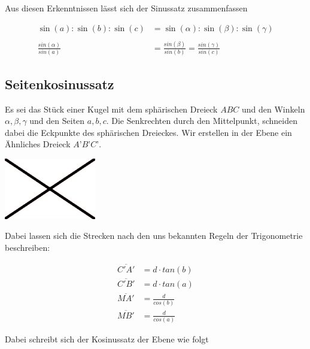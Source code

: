 \begin{refsection}
Aus diesen Erkenntnissen lässt sich der Sinussatz zusammenfassen

\begin{satz}
\label{skript:kugel:satz:Sinussatz}
\end{satz}

\begin{align*}
\sin(a) : \sin(b) : \sin(c) &= \sin(\alpha) : \sin(\beta) : \sin(\gamma) \\
 \\
\frac{sin(\alpha)}{sin(a)} &= \frac{sin(\beta)}{sin(b)} = \frac{sin(\gamma)}{sin(c)}
\end{align*} 


\subsection{Seitenkosinussatz}

Es sei das Stück einer Kugel mit dem sphärischen Dreieck $ABC$ und den Winkeln $\alpha, \beta, \gamma$ und den Seiten $a, b, c$. Die Senkrechten durch den Mittelpunkt, schneiden dabei die Eckpunkte des sphärischen Dreieckes. Wir erstellen in der Ebene ein Ähnliches Dreieck $A’B’C’$.

\begin{center}
        \includegraphics[width=0.3\textwidth]{kugel/Beispielbild.jpg}
\end{center}

Dabei lassen sich die Strecken nach den uns bekannten Regeln der Trigonometrie beschreiben:

\begin{align*}
\overline{C'A'} &= d\cdot {tan(b)} \\
\overline{C'B'} &= d\cdot {tan(a)} \\
\overline{MA'} &= \frac{ d }{cos(b)} \\
\overline{MB'} &= \frac{ d }{cos(a)}
\end{align*} 

Dabei schreibt sich der Kosinussatz der Ebene wie folgt


\end{refsection}
